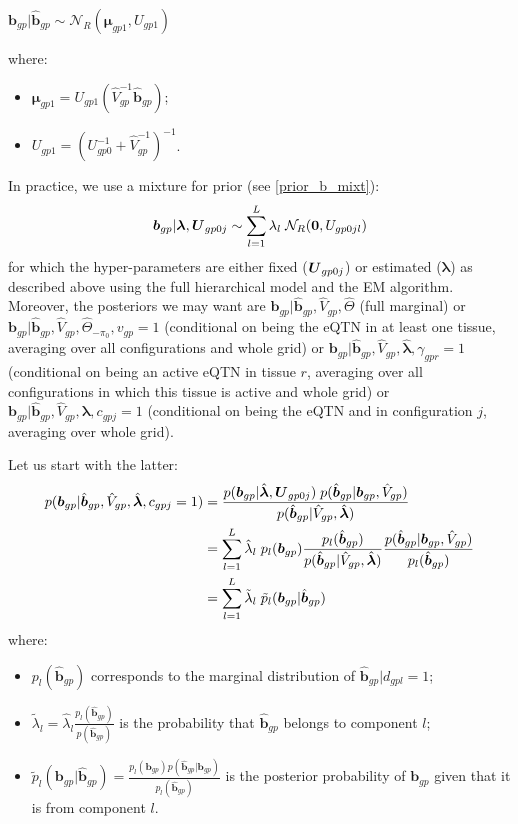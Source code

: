 \documentclass[10pt]{article}
\newcommand{\Norm}{{\mathcal{N}}} %
\newcommand{\Uv}{\mbox{\boldmath$U$}}
\begin{document}
$\bm{b}_{gp} | \hat{\bm{b}}_{gp} \sim \Norm_R(\bm{\mu}_{gp1}, U_{gp1})$

where:
\begin{itemize}
\item $\bm{\mu}_{gp1} = U_{gp1} (\hat{V}_{gp}^{-1} \hat{\bm{b}}_{gp})$;
\item $U_{gp1} = (U_{gp0}^{-1} + \hat{V}_{gp}^{-1})^{-1}$.
\end{itemize}

In practice, we use a mixture for prior (see \ref{prior_b_mixt}):
\begin{equation}
  \bm{b}_{gp} | \bm{\lambda}, \Uv_{gp0j} \sim \sum_{l=1}^L \lambda_l \; \Norm_R(\bm{0}, U_{gp0jl})
\end{equation}
for which the hyper-parameters are either fixed ($\Uv_{gp0j}$) or estimated ($\bm{\lambda}$) as described above using the full hierarchical model and the EM algorithm.
Moreover, the posteriors we may want are $\bm{b}_{gp} | \hat{\bm{b}}_{gp}, \hat{V}_{gp}, \hat{\Theta}$ (full marginal) or $\bm{b}_{gp} | \hat{\bm{b}}_{gp}, \hat{V}_{gp}, \hat{\Theta}_{-\pi_0}, v_{gp}=1$ (conditional on being the eQTN in at least one tissue, averaging over all configurations and whole grid) or $\bm{b}_{gp} | \hat{\bm{b}}_{gp}, \hat{V}_{gp}, \hat{\bm{\lambda}}, \gamma_{gpr}=1$ (conditional on being an active eQTN in tissue $r$, averaging over all configurations in which this tissue is active and whole grid) or $\bm{b}_{gp} | \hat{\bm{b}}_{gp}, \hat{V}_{gp}, \hat{\bm{\lambda}}, c_{gpj}=1$ (conditional on being the eQTN and in configuration $j$, averaging over whole grid).

Let us start with the latter:
\begin{equation}
  \begin{aligned}
    p(\bm{b}_{gp} | \hat{\bm{b}}_{gp}, \hat{V}_{gp}, \hat{\bm{\lambda}}, c_{gpj}=1) &= \frac{p(\bm{b}_{gp} | \hat{\bm{\lambda}}, \Uv_{gp0j}) \; p(\hat{\bm{b}}_{gp} | \bm{b}_{gp}, \hat{V}_{gp})}{p(\hat{\bm{b}}_{gp} | \hat{V}_{gp}, \hat{\bm{\lambda}})} \\
    &= \sum_{l=1}^L \hat{\lambda}_l \; p_l(\bm{b}_{gp}) \frac{p_l(\hat{\bm{b}}_{gp})}{p(\hat{\bm{b}}_{gp} | \hat{V}_{gp}, \hat{\bm{\lambda}})} \frac{p(\hat{\bm{b}}_{gp} | \bm{b}_{gp}, \hat{V}_{gp})}{p_l(\hat{\bm{b}}_{gp})} \\
    &=\sum_{l=1}^L \tilde{\lambda}_l \; \tilde{p}_l (\bm{b}_{gp} | \hat{\bm{b}}_{gp}) \\
  \end{aligned}
\end{equation}
where:
\begin{itemize}
\item $p_l(\hat{\bm{b}}_{gp})$ corresponds to the marginal distribution of $\hat{\bm{b}}_{gp} | d_{gpl}=1$;
\item $\tilde{\lambda}_l = \hat{\lambda}_l \frac{p_l(\hat{\bm{b}}_{gp})}{p(\hat{\bm{b}}_{gp})}$ is the probability that $\hat{\bm{b}}_{gp}$ belongs to component $l$;
\item $\tilde{p}_l (\bm{b}_{gp} | \hat{\bm{b}}_{gp}) = \frac{p_l(\bm{b}_{gp}) p(\hat{\bm{b}}_{gp} | \bm{b}_{gp})}{p_l(\hat{\bm{b}}_{gp})}$ is the posterior probability of $\bm{b}_{gp}$ given that it is from component $l$.
\end{itemize}
\end{document}

